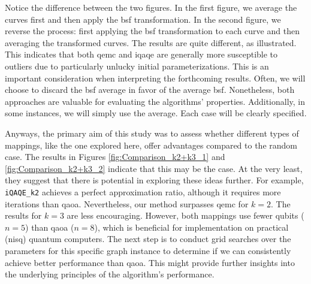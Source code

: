 Notice the difference between the two figures. In the first figure, we average the curves first and then apply the \acrshort{bsf} transformation. In the second figure, we reverse the process: first applying the \acrshort{bsf} transformation to each curve and then averaging the transformed curves. The results are quite different, as illustrated. This indicates that both \acrshort{qemc} and \acrshort{iqaqe} are generally more susceptible to outliers due to particularly unlucky initial parameterizations. This is an important consideration when interpreting the forthcoming results. Often, we will choose to discard the \acrshort{bsf} average in favor of the average \acrshort{bsf}. Nonetheless, both approaches are valuable for evaluating the algorithms' properties. Additionally, in some instances, we will simply use the average. Each case will be clearly specified.

Anyways, the primary aim of this study was to assess whether different types of mappings, like the one explored here, offer advantages compared to the random case. The results in Figures \ref{fig:Comparison_k2+k3_1} and \ref{fig:Comparison_k2+k3_2} indicate that this may be the case. At the very least, they suggest that there is potential in exploring these ideas further. For example, \texttt{iQAQE\_k2} achieves a perfect approximation ratio, although it requires more iterations than \acrshort{qaoa}. Nevertheless, our method surpasses \acrshort{qemc} for $k = 2$. The results for $k = 3$ are less encouraging. However, both mappings use fewer qubits ($n = 5$) than \acrshort{qaoa} ($n = 8$), which is beneficial for implementation on practical (\acrshort{nisq}) quantum computers. The next step is to conduct grid searches over the parameters for this specific graph instance to determine if we can consistently achieve better performance than \acrshort{qaoa}. This might provide further insights into the underlying principles of the algorithm's performance.


